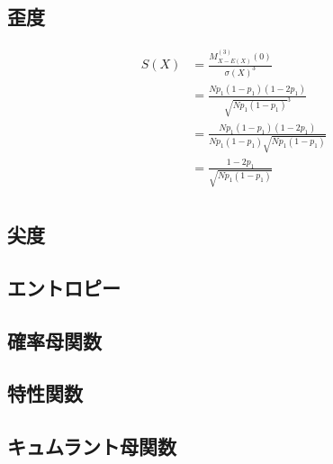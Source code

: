 \documentclass[dvipdfmx]{jsarticle}
\begin{document}
 \subsection{歪度}
 \begin{align}
  S\left(X\right)&=\frac{M_{X-E\left(X\right)}^{\left(3\right)}\left(0\right)}{\sigma\left(X\right)^3}\nonumber\\
  &=\frac{Np_1\left(1-p_1\right)\left(1-2p_1\right)}{\sqrt{Np_1\left(1-p_1\right)}^3}\nonumber\\
  &=\frac{Np_1\left(1-p_1\right)\left(1-2p_1\right)}{Np_1\left(1-p_1\right)\sqrt{Np_1\left(1-p_1\right)}}\nonumber\\
  &=\frac{1-2p_1}{\sqrt{Np_1\left(1-p_1\right)}}\nonumber\\
 \end{align}
 \subsection{尖度}
 \subsection{エントロピー}
 \subsection{確率母関数}
 \subsection{特性関数}
 \subsection{キュムラント母関数}
\end{document}

